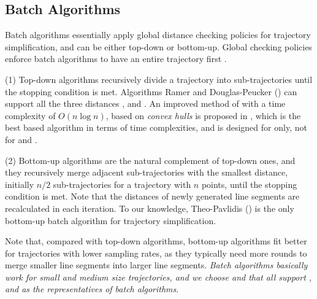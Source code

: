 \subsection{Batch Algorithms}
Batch algorithms essentially apply global distance checking policies for trajectory simplification, and can be either top-down or bottom-up.
Global checking policies enforce batch algorithms to have an entire trajectory first \cite{Meratnia:Spatiotemporal}.

(1) Top-down algorithms recursively divide a trajectory into sub-trajectories until the stopping condition is met.
Algorithms Ramer \cite{Ramer:Split} and Douglas-Peucker (\dpa)  \cite{Douglas:Peucker} can support all the three distances \ped, \sed and \dad.
An improved method of \dpa with a time complexity of $O(n\log n)$, based on \emph{convex hulls} is proposed in \cite{Hershberger:Speeding}, which is the best \dpa based  algorithm in terms of time complexities, and is designed for \ped only, not for \sed and \dad.

(2) Bottom-up algorithms are the natural complement of top-down ones, and they recursively merge adjacent sub-trajectories with the smallest distance, initially $n/2$  sub-trajectories for a trajectory with $n$ points, until the stopping condition is met. Note that the distances of newly generated line segments are recalculated in {each} iteration. To our knowledge, Theo-Pavlidis (\tpa) \cite{Pavlidis:Segment} is the only bottom-up batch \lsa algorithm for trajectory simplification.

Note that, compared with top-down algorithms, bottom-up algorithms fit better for trajectories with lower sampling rates, as they typically need more rounds to merge smaller line segments into larger line segments. {\em Batch algorithms basically work for small and medium size trajectories, and we choose \dpa and \tpa that all support \ped, \sed and \dad  as the   representatives of  batch \lsa algorithms}.







